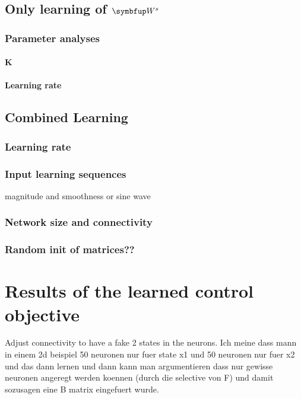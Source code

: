 \subsection{Only learning of $\bmu{W}^s$}
\subsubsection{Parameter analyses}
\paragraph{K}
\paragraph{Learning rate}
\subsection{Combined Learning}

\subsubsection{Learning rate}
\subsubsection{Input learning sequences}
magnitude and smoothness or sine wave
\subsubsection{Network size and connectivity}
\subsubsection{Random init of matrices??}





\section{Results of the learned control objective}
Adjust connectivity to have a fake 2 states in the neurons.
Ich meine dass mann in einem 2d beispiel 50 neuronen nur fuer state x1 und 50 neuronen nur fuer x2 und das dann lernen und dann kann man argumentieren dass nur gewisse neuronen angeregt werden koennen (durch die selective von F) und damit sozusagen eine B matrix eingefuert wurde.